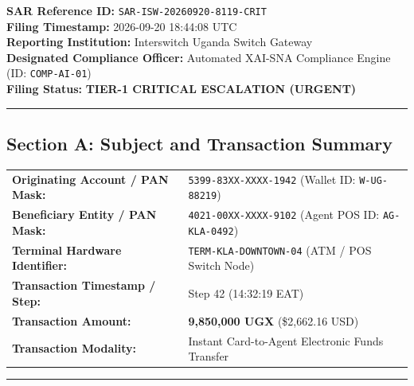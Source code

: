 \begin{tcolorbox}[colback=gray!5,colframe=black!70,title=\textbf{FINANCIAL INTELLIGENCE AUTHORITY (UGANDA) --- SUSPICIOUS ACTIVITY REPORT (SAR)}]
\small
\textbf{SAR Reference ID:} \texttt{SAR-ISW-20260920-8119-CRIT}\\
\textbf{Filing Timestamp:} 2026-09-20 18:44:08 UTC\\
\textbf{Reporting Institution:} Interswitch Uganda Switch Gateway\\
\textbf{Designated Compliance Officer:} Automated XAI-SNA Compliance Engine (ID: \texttt{COMP-AI-01})\\
\textbf{Filing Status:} \textbf{TIER-1 CRITICAL ESCALATION (URGENT)}

\vspace{0.8em}
\hrule
\vspace{0.8em}

\subsection*{Section A: Subject and Transaction Summary}
\begin{tabular}{@{}p{5.5cm}p{8.5cm}@{}}
\textbf{Originating Account / PAN Mask:} & \texttt{5399-83XX-XXXX-1942} (Wallet ID: \texttt{W-UG-88219}) \\
\textbf{Beneficiary Entity / PAN Mask:} & \texttt{4021-00XX-XXXX-9102} (Agent POS ID: \texttt{AG-KLA-0492}) \\
\textbf{Terminal Hardware Identifier:} & \texttt{TERM-KLA-DOWNTOWN-04} (ATM / POS Switch Node) \\
\textbf{Transaction Timestamp / Step:} & Step 42 (14:32:19 EAT) \\
\textbf{Transaction Amount:} & \textbf{9,850,000 UGX} (\$2,662.16 USD) \\
\textbf{Transaction Modality:} & Instant Card-to-Agent Electronic Funds Transfer \\
\end{tabular}

\vspace{0.8em}
\hrule
\vspace{0.8em}


\end{tcolorbox}
